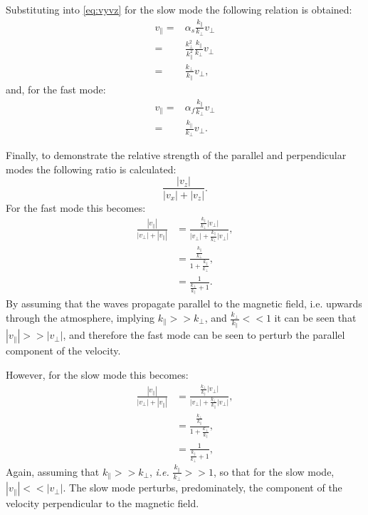 Substituting into \cref{eq:vyvz} for the slow mode the following relation is obtained:
\begin{align}
    v_\parallel =& \alpha_s \frac{k_\parallel}{k_\perp}v_\perp\\
                =& \frac{k^2_\perp}{k^2_\parallel}\frac{k_\parallel}{k_\perp}v_\perp\\
                =& \frac{k_\perp}{k_\parallel}v_\perp,
\end{align}
and, for the fast mode:
\begin{align}
    v_\parallel =& \alpha_f \frac{k_\parallel}{k_\perp}v_\perp\\
                =& \frac{k_\parallel}{k_\perp}v_\perp.
\end{align}

Finally, to demonstrate the relative strength of the parallel and perpendicular modes the following ratio is calculated:
\begin{equation}
    \frac{|v_z|}{|v_x|+|v_z|}.
\end{equation}
For the fast mode this becomes:
\begin{align}
\frac{|v_\parallel|}{|v_\perp|+|v_\parallel|} &= \frac{\frac{k_\parallel}{k_\perp}|v_\perp|}{|v_\perp|+\frac{k_\parallel}{k_\perp}|v_\perp|},\\
&= \frac{\frac{k_\parallel}{k_\perp}}{1+\frac{k_\parallel}{k_\perp}},\\
&= \frac{1}{\frac{k_\perp}{k_\parallel}+1}.
\end{align}
By assuming that the waves propagate parallel to the magnetic field, i.e. upwards through the atmosphere, implying $k_\parallel >> k_\perp$, and $\displaystyle \frac{k_\perp}{k_\parallel} << 1$ it can be seen that $|v_\parallel| >> |v_\perp|$, and therefore the fast mode can be seen to perturb the parallel component of the velocity.

However, for the slow mode this becomes:
\begin{align}
    \frac{|v_\parallel|}{|v_\perp|+|v_\parallel|} &= \frac{\frac{k_\perp}{k_\parallel}|v_\perp|}{|v_\perp|+\frac{k_\perp}{k_\parallel}|v_\perp|},\\
    &= \frac{\frac{k_\perp}{k_\parallel}}{1+\frac{k_\perp}{k_\parallel}},\\
    &= \frac{1}{\frac{k_\parallel}{k_\perp} + 1},
\end{align}
Again, assuming that $k_\parallel >> k_\perp$, \textit{i.e.} $\displaystyle \frac{k_\parallel}{k_\perp} >> 1$, so that for the slow mode, $|v_\parallel| << |v_\perp|$.
The slow mode perturbs, predominately, the component of the velocity perpendicular to the magnetic field.  


